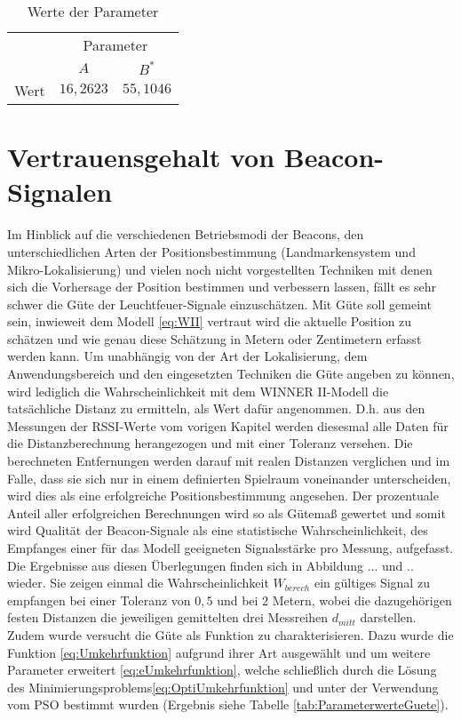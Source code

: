 \begin{table}[H]
\begin{center}
\begin{tabular}{|c|c|c|}
\cline{2-3}
\multicolumn{1}{c|}{} & \multicolumn{2}{c|}{Parameter} \\
\cline{2-3}
\multicolumn{1}{c|}{} & $A$ & $B^{\ast}$ \\
\hline
\multirow{1}{*}{Wert} & $16,2623$ & $55,1046$ \\
\hline
\end{tabular}
\end{center}
\caption{Werte der Parameter}
\label{tab:Parameterwerte}
\end{table} 
\section{Vertrauensgehalt von Beacon-Signalen}
Im Hinblick auf die verschiedenen Betriebsmodi der Beacons, den unterschiedlichen Arten der Positionsbestimmung (Landmarkensystem und Mikro-Lokalisierung) und vielen noch nicht vorgestellten Techniken mit denen sich die Vorhersage der Position bestimmen und verbessern lassen, fällt es sehr schwer die Güte der Leuchtfeuer-Signale einzuschätzen. Mit Güte soll gemeint sein, inwieweit dem Modell \ref{eq:WII} vertraut wird die aktuelle Position zu schätzen und wie genau diese Schätzung in Metern oder Zentimetern erfasst werden kann. Um unabhängig von der Art der Lokalisierung, dem Anwendungsbereich und den eingesetzten Techniken die Güte angeben zu können, wird lediglich die Wahrscheinlichkeit mit dem WINNER II-Modell die tatsächliche Distanz zu ermitteln, als Wert dafür angenommen. D.h. aus den Messungen der RSSI-Werte vom vorigen Kapitel werden diesesmal alle Daten für die Distanzberechnung herangezogen und mit einer Toleranz versehen. Die berechneten Entfernungen werden darauf mit realen Distanzen verglichen und im Falle, dass sie sich nur in einem definierten Spielraum voneinander unterscheiden, wird dies als eine erfolgreiche Positionsbestimmung angesehen. Der prozentuale Anteil aller erfolgreichen Berechnungen wird so als Gütemaß gewertet und somit wird Qualität der Beacon-Signale als eine statistische Wahrscheinlichkeit, des Empfanges einer für das Modell geeigneten Signalsstärke pro Messung, aufgefasst. Die Ergebnisse aus diesen Überlegungen finden sich in Abbildung ... und .. wieder. Sie zeigen einmal die Wahrscheinlichkeit $W_{berech}$ ein gültiges Signal zu empfangen bei einer Toleranz von $0,5$ und bei $2$ Metern, wobei die dazugehörigen festen Distanzen die jeweiligen gemittelten drei Messreihen $d_{mitt}$ darstellen. Zudem wurde versucht die Güte als Funktion zu charakterisieren. Dazu wurde die Funktion \ref{eq:Umkehrfunktion} aufgrund ihrer Art ausgewählt und um weitere Parameter erweitert \ref{eq:eUmkehrfunktion}, welche schließlich durch die Lösung des Minimierungsproblems\ref{eq:OptiUmkehrfunktion} und unter der Verwendung vom PSO bestimmt wurden (Ergebnis siehe Tabelle \ref{tab:ParameterwerteGuete}).
